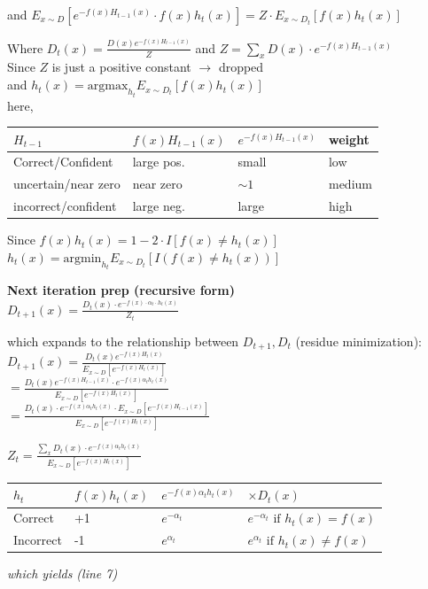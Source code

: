 \documentclass{article}
\begin{document}
and $E_{x \sim D}[e^{-f(x)H_{t-1}(x)} \cdot f(x)h_t(x)] = Z \cdot E_{x \sim D_t}[f(x)h_t(x)]$

Where $D_t(x) = \frac{D(x) e^{-f(x)H_{t-1}(x)}}{Z}$ and $Z = \sum_{x} D(x) \cdot e^{-f(x)H_{t-1}(x)}$\\

Since $Z$ is just a positive constant $\rightarrow$ dropped \\

and $h_t(x) = \text{argmax}_{h_t} E_{x \sim D_t}[f(x)h_t(x)]$\\

here,

\begin{table}[h]
\centering
\begin{tabular}{|l|l|l|l|}
\hline
$H_{t-1}$ & $f(x)H_{t-1}(x)$ & $e^{-f(x)H_{t-1}(x)}$ & weight \\ \hline
Correct/Confident & large pos. & small & low \\ \hline
uncertain/near zero & near zero & $\sim 1$ & medium \\ \hline
incorrect/confident & large neg. & large & high \\ \hline
\end{tabular}
\end{table}

Since $f(x)h_t(x) = 1 - 2 \cdot I[f(x) \ne h_t(x)]$ \\
$h_t(x) = \text{argmin}_{h_t} E_{x \sim D_t}[I(f(x) \ne h_t(x))]$

\textbf{Next iteration prep (recursive form)} \\
$D_{t+1}(x) = \frac{D_t(x) \cdot e^{-f(x) \cdot \alpha_t \cdot h_t(x)}}{Z_t}$

which expands to the relationship between $D_{t+1}, D_t$ (residue minimization): \\
$D_{t+1}(x) = \frac{D_t(x)e^{-f(x)H_t(x)}}{E_{x \sim D}[e^{-f(x)H_t(x)}]}$ \\
$= \frac{D_t(x) e^{-f(x)H_{t-1}(x)} \cdot e^{-f(x)\alpha_t h_t(x)}}{E_{x \sim D}[e^{-f(x)H_t(x)}]}$ \\
$= \frac{D_t(x) \cdot e^{-f(x)\alpha_t h_t(x)} \cdot E_{x \sim D}[e^{-f(x)H_{t-1}(x)}]}{E_{x \sim D}[e^{-f(x)H_t(x)}]}$

$Z_t = \frac{\sum_{x} D_t(x) \cdot e^{-f(x)\alpha_t h_t(x)}}{E_{x \sim D}[e^{-f(x)H_t(x)}]}$

\begin{table}[h]
\centering
\begin{tabular}{|l|l|l|l|}
\hline
$h_t$ & $f(x)h_t(x)$ & $e^{-f(x)\alpha_t h_t(x)}$ & $\times D_t(x)$ \\ \hline
Correct & +1 & $e^{-\alpha_t}$ & $e^{-\alpha_t} \text{ if } h_t(x) = f(x)$ \\ \hline
Incorrect & -1 & $e^{\alpha_t}$ & $e^{\alpha_t} \text{ if } h_t(x) \ne f(x)$ \\ \hline
\end{tabular}
\end{table}

\textit{which yields (line 7)}
\end{document}
